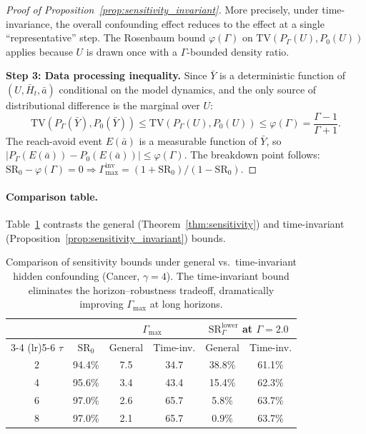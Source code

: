 \documentclass{article}
\newcommand{\TV}{\mathrm{TV}}
\newcommand{\bH}{\bar{H}}
\newcommand{\ba}{\bar{a}}
\newcommand{\bY}{\bar{Y}}
\begin{document}
\begin{proof}[Proof of Proposition~\ref{prop:sensitivity_invariant}]
More precisely, under time-invariance, the overall confounding effect reduces to the effect at a single ``representative'' step. The Rosenbaum bound $\varphi(\Gamma)$ on $\TV(P_\Gamma(U), P_0(U))$ applies because $U$ is drawn once with a $\Gamma$-bounded density ratio.

\textbf{Step 3: Data processing inequality.} Since $\bY$ is a deterministic function of $(U, \bH_t, \ba)$ conditional on the model dynamics, and the only source of distributional difference is the marginal over $U$:
\[
\TV(P_\Gamma(\bY), P_0(\bY)) \leq \TV(P_\Gamma(U), P_0(U)) \leq \varphi(\Gamma) = \frac{\Gamma - 1}{\Gamma + 1}.
\]
The reach-avoid event $E(\ba)$ is a measurable function of $\bY$, so $|P_\Gamma(E(\ba)) - P_0(E(\ba))| \leq \varphi(\Gamma)$. The breakdown point follows: $\mathrm{SR}_0 - \varphi(\Gamma) = 0 \Rightarrow \Gamma_{\max}^{\mathrm{inv}} = (1 + \mathrm{SR}_0)/(1 - \mathrm{SR}_0)$.
\end{proof}

\paragraph{Comparison table.} Table~\ref{tab:sensitivity_comparison} contrasts the general (Theorem~\ref{thm:sensitivity}) and time-invariant (Proposition~\ref{prop:sensitivity_invariant}) bounds.

\begin{table}[h]
\centering
\caption{Comparison of sensitivity bounds under general vs.\ time-invariant hidden confounding (Cancer, $\gamma = 4$). The time-invariant bound eliminates the horizon--robustness tradeoff, dramatically improving $\Gamma_{\max}$ at long horizons.}
\label{tab:sensitivity_comparison}
\small
\begin{tabular}{c c cc cc}
\toprule
& & \multicolumn{2}{c}{$\Gamma_{\max}$} & \multicolumn{2}{c}{$\mathrm{SR}_\Gamma^{\mathrm{lower}}$ at $\Gamma{=}2.0$} \\
\cmidrule(lr){3-4} \cmidrule(lr){5-6}
$\tau$ & $\mathrm{SR}_0$ & General & Time-inv. & General & Time-inv. \\
\midrule
2 & 94.4\% & 7.5  & 34.7 & 38.8\% & 61.1\% \\
4 & 95.6\% & 3.4  & 43.4 & 15.4\% & 62.3\% \\
6 & 97.0\% & 2.6  & 65.7 & 5.8\%  & 63.7\% \\
8 & 97.0\% & 2.1  & 65.7 & 0.9\%  & 63.7\% \\
\bottomrule
\end{tabular}
\end{table}
\end{document}

